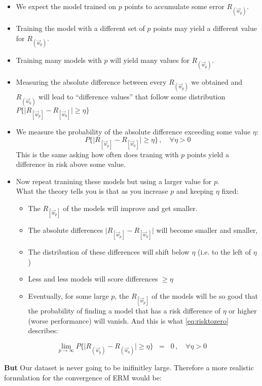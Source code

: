 \begin{frame}
			\begin{itemize}
			\item We expect the model trained on $p$ points to accumulate some error $R_{(\vec w_p)}$.
			\item Training the model with a different set of $p$ points may yield a different value for $R_{(\vec w_p)}$.
			\item Training many models with $p$ will yield many values for $R_{(\vec w_p)}$.
			\item Measuring the absolute difference between every $R_{(\vec w_p)}$ we obtained and $R_{(\vec w_0)}$ will lead to ``difference values'' that follow some distribution $P\bigg\{ 
					{
						\Big|R_{[\vec w_p]} - R_{[\vec w_0]}\Big| 
					}
				\geq \eta \bigg\}$
			\item We measure the probability of the absolute difference exceeding some value $\eta$:
			\begin{equation}
			P\bigg\{ 
					{
						\Big|R_{[\vec w_p]} - R_{[\vec w_0]}\Big| 
					}
				\geq \eta \bigg\}\,, \quad \forall \eta > 0
			\end{equation}
			This is the same asking how often does traning with $p$ points yield a difference in risk above some value.
			\item Now repeat tranining these models but using a larger value for $p$.\\
			What the theory tells you is that as you increase $p$ and keeping $\eta$ fixed:
			\begin{itemize}
			\item The $R_{[\vec w_p]}$ of the models will improve and get smaller.
			\item The absolute differences $\Big|R_{[\vec w_p]} - R_{[\vec w_0]}\Big|$ will become smaller and smaller,
			\item The distribution of these differences will shift below $\eta$ (i.e. to the left of $\eta$)
			\item Less and less models will score differences $\ge \eta$
			\item Eventually, for some large $p$, the $R_{[\vec w_p]}$ of the models will be so good that the probability of finding a model that has a risk difference of $\eta$ or higher (worse performance) will vanish. And this is what \eqref{eq:risktozero} describes:
			\end{itemize}
			
			\end{itemize}
			
			\begin{equation}
				\lim_{p \to \infty} P\bigg\{ 
					{
						\Big|R_{(\vec w_p)} - R_{(\vec w_0)}\Big| 
					}
				\geq \eta \bigg\}\;\;=\;\; 0 \,, \quad \forall \eta > 0
				\label{eq:risktozero}
			\end{equation}
			
			\textbf{But} Our dataset is never going to be inifinitley large. Therefore a more realistic formulation for the convergence of ERM would be:
			
			
\end{frame}
